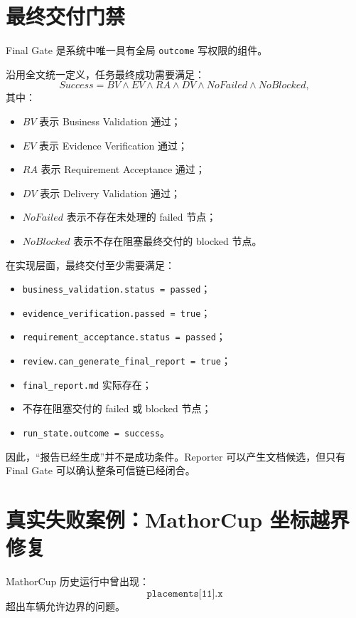 \documentclass[UTF8,a4paper,12pt,oneside]{ctexbook}
\begin{document}
\section{最终交付门禁}

Final Gate 是系统中唯一具有全局 \texttt{outcome} 写权限的组件。

沿用全文统一定义，任务最终成功需要满足：
\[
Success
=
BV
\land
EV
\land
RA
\land
DV
\land
NoFailed
\land
NoBlocked,
\]
其中：

\begin{itemize}
    \item $BV$ 表示 Business Validation 通过；
    \item $EV$ 表示 Evidence Verification 通过；
    \item $RA$ 表示 Requirement Acceptance 通过；
    \item $DV$ 表示 Delivery Validation 通过；
    \item $NoFailed$ 表示不存在未处理的 failed 节点；
    \item $NoBlocked$ 表示不存在阻塞最终交付的 blocked 节点。
\end{itemize}

在实现层面，最终交付至少需要满足：

\begin{itemize}
    \item \texttt{business\_validation.status = passed}；
    \item \texttt{evidence\_verification.passed = true}；
    \item \texttt{requirement\_acceptance.status = passed}；
    \item \texttt{review.can\_generate\_final\_report = true}；
    \item \texttt{final\_report.md} 实际存在；
    \item 不存在阻塞交付的 failed 或 blocked 节点；
    \item \texttt{run\_state.outcome = success}。
\end{itemize}

因此，“报告已经生成”并不是成功条件。Reporter 可以产生文档候选，但只有 Final Gate 可以确认整条可信链已经闭合。


\section{真实失败案例：MathorCup 坐标越界修复}

MathorCup 历史运行中曾出现：
\[
\texttt{placements[11].x}
\]
超出车辆允许边界的问题。
\end{document}
